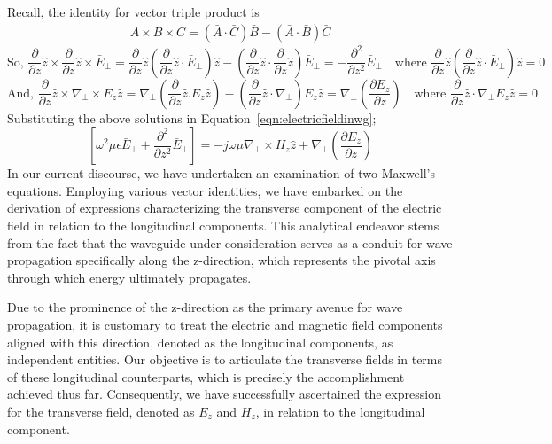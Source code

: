 Recall, the identity for vector triple product is
\begin{align*}
A\times B\times C = (\bar{A}\cdot\bar{C})\bar{B} - (\bar{A}\cdot\bar{B})\bar{C}
\end{align*}
\begin{dmath*}
\text{So, }\frac{\partial}{\partial z}\hat{z}\times\frac{\partial}{\partial z}\hat{z}\times\bar{E}_\bot = \frac{\partial}{\partial z}\hat{z}\left(\frac{\partial}{\partial z}\hat{z}\cdot\bar{E}_\bot\right)\hat{z} - \left(\frac{\partial}{\partial z}\hat{z}\cdot\frac{\partial}{\partial z}\hat{z}\right)\bar{E}_\bot = -\frac{\partial^2}{\partial z^2}\bar{E}_\bot\quad\text{where $\dfrac{\partial}{\partial z}\hat{z}\left(\dfrac{\partial}{\partial z}\hat{z}\cdot\bar{E}_\bot\right)\hat{z} = 0$}
\end{dmath*}
\begin{dmath*}
\text{And, }\frac{\partial}{\partial z}\hat{z}\times\nabla_\bot\times E_z\hat{z} = \nabla_\bot\left(\frac{\partial}{\partial z}\hat{z}.E_z\hat{z}\right) - \left(\frac{\partial}{\partial z}\hat{z}\cdot\nabla_\bot\right)E_z\hat{z} = \nabla_\bot\left(\frac{\partial E_z}{\partial z}\right)\quad\text{where $\dfrac{\partial}{\partial z}\hat{z}\cdot\nabla_\bot E_z\hat{z} = 0$}
\end{dmath*}
Substituting the above solutions in Equation~\ref{eqn:electricfieldinwg};
\begin{dmath}
\left[\omega^2\mu\epsilon\bar{E}_\bot+\frac{\partial^2}{\partial z^2}\bar{E}_\bot\right] = -j\omega\mu\nabla_\bot\times H_z\hat{z} + \nabla_\bot\left(\frac{\partial E_z}{\partial z}\right)\label{eqn:generalformulation}
\end{dmath}
In our current discourse, we have undertaken an examination of two Maxwell's equations. Employing various vector identities, we have embarked on the derivation of expressions characterizing the transverse component of the electric field in relation to the longitudinal components. This analytical endeavor stems from the fact that the waveguide under consideration serves as a conduit for wave propagation specifically along the z-direction, which represents the pivotal axis through which energy ultimately propagates.

Due to the prominence of the z-direction as the primary avenue for wave propagation, it is customary to treat the electric and magnetic field components aligned with this direction, denoted as the longitudinal components, as independent entities. Our objective is to articulate the transverse fields in terms of these longitudinal counterparts, which is precisely the accomplishment achieved thus far. Consequently, we have successfully ascertained the expression for the transverse field, denoted as $E_z$ and $H_z$, in relation to the longitudinal component.

